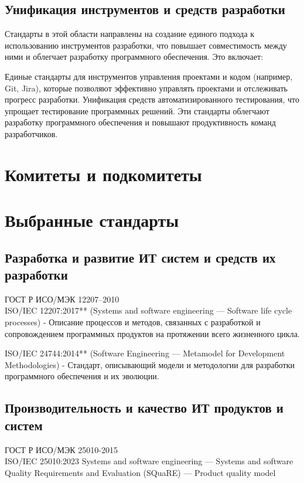 \subsection{Унификация инструментов и средств разработки}
Стандарты в этой области направлены на создание единого подхода к использованию инструментов разработки, что повышает совместимость между ними и облегчает разработку программного обеспечения. Это включает:

Единые стандарты для инструментов управления проектами и кодом (например, Git, Jira), которые позволяют эффективно управлять проектами и отслеживать прогресс разработки.
Унификация средств автоматизированного тестирования, что упрощает тестирование программных решений.
Эти стандарты облегчают разработку программного обеспечения и повышают продуктивность команд разработчиков.

\section{Комитеты и подкомитеты}

\section{Выбранные стандарты}

\subsection{Разработка и развитие ИТ систем и средств их разработки}

ГОСТ Р ИСО/МЭК 12207--2010\\
ISO/IEC 12207:2017** (Systems and software engineering — Software life cycle processes)
     - Описание процессов и методов, связанных с разработкой и сопровождением программных продуктов на протяжении всего жизненного цикла.

ISO/IEC 24744:2014** (Software Engineering — Metamodel for Development Methodologies)
     - Стандарт, описывающий модели и методологии для разработки программного обеспечения и их эволюции.

\subsection{Производительность и качество ИТ продуктов и систем}
ГОСТ Р ИСО/МЭК 25010-2015\\
ISO/IEC 25010:2023 Systems and software engineering — Systems and software Quality Requirements and Evaluation (SQuaRE) — Product quality model

